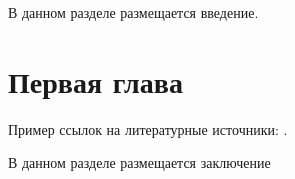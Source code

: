 \documentclass[specification,annotation]{itmo-student-thesis}
\begin{document}

\tableofcontents

\startprefacepage

В данном разделе размещается введение.

\chapter{Первая глава}

Пример ссылок на литературные источники: \cite{hall-combinatorics,kudryashov-codingtheory,finding-and-counting-given-length-cycles,counting-short-cycles-of-quasi-cyclic-protograph-ldpc-codes,message-passing-algorithm-for-counting-short-cycles-in-graph,how-to-find-long-paths-efficiently,color-coding,algorithm-for-counting-for-counting-short-cycles-in-bipartite-graphs,opencl-cuda-algorithms-for-parallel-decoding-of-any-irregular-ldpc-code-using-gpu,stressing-the-ber-simulation-of-ldpc-codes-in-the-error-floor-region-using-gpu-clusters,on-the-number-of-cycles-in-a-graph,understanding-belief-propogation,mackay-codes}.

\startconclusionpage

В данном разделе размещается заключение

\printmainbibliography
\end{document}
